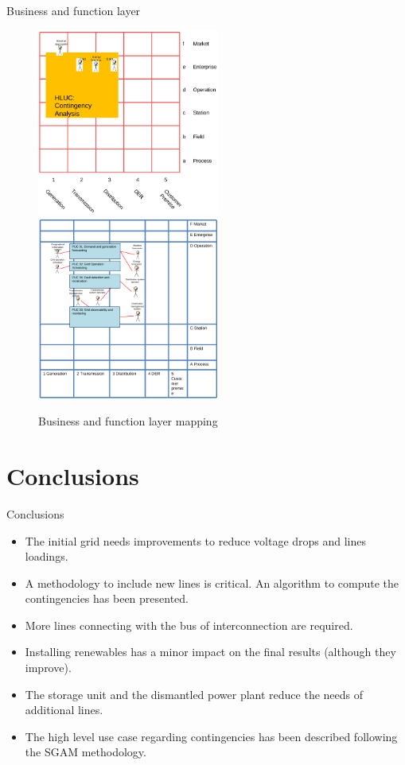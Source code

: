   \begin{frame}{Business and function layer}


\begin{figure}[!htb]\centering
  \includegraphics[width=6.0cm]{Data/business.png}
  \hspace{0.1cm}
  \includegraphics[width=6.0cm]{Data/function.png}
\caption{Business and function layer mapping}
\label{fig:functs}
\end{figure}

  \end{frame}


  \section{Conclusions}
  \begin{frame}{Conclusions}
    \begin{itemize}
      \item The initial grid needs improvements to reduce voltage drops and lines loadings.
        \item A methodology to include new lines is critical. An algorithm to compute the contingencies has been presented.
          \item More lines connecting with the bus of interconnection are required.
          \item Installing renewables has a minor impact on the final results (although they improve).
            \item The storage unit and the dismantled power plant reduce the needs of additional lines.
              \item The high level use case regarding contingencies has been described following the SGAM methodology.
    \end{itemize}
  \end{frame}

